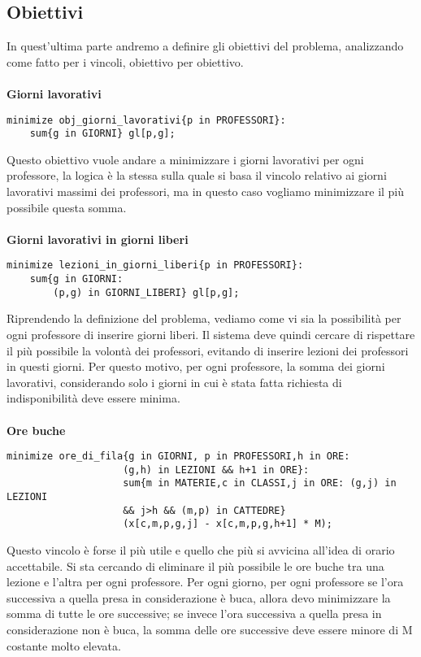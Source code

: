 \documentclass{article}
\begin{document}
\subsection{Obiettivi}
In quest'ultima parte andremo a definire gli obiettivi del problema, analizzando come fatto per i vincoli, obiettivo per obiettivo.
\\\\\textbf{Giorni lavorativi}
\begin{verbatim}
minimize obj_giorni_lavorativi{p in PROFESSORI}:
	sum{g in GIORNI} gl[p,g];
\end{verbatim}
Questo obiettivo vuole andare a minimizzare i giorni lavorativi per ogni professore, la logica è la stessa sulla quale si basa il vincolo relativo ai giorni lavorativi massimi dei professori, ma in questo caso vogliamo minimizzare il più possibile questa somma.
\\\\\textbf{Giorni lavorativi in giorni liberi}
\begin{verbatim}
minimize lezioni_in_giorni_liberi{p in PROFESSORI}:
	sum{g in GIORNI:
		(p,g) in GIORNI_LIBERI} gl[p,g];
\end{verbatim}
Riprendendo la definizione del problema, vediamo come vi sia la possibilità per ogni professore di inserire giorni liberi. Il sistema deve quindi cercare di rispettare il più possibile la volontà dei professori, evitando di inserire lezioni dei professori in questi giorni. Per questo motivo, per ogni professore, la somma dei giorni lavorativi, considerando solo i giorni in cui è stata fatta richiesta di indisponibilità deve essere minima.
\\\\\textbf{Ore buche}
\begin{verbatim}
minimize ore_di_fila{g in GIORNI, p in PROFESSORI,h in ORE: 
                    (g,h) in LEZIONI && h+1 in ORE}:
                    sum{m in MATERIE,c in CLASSI,j in ORE: (g,j) in LEZIONI
                    && j>h && (m,p) in CATTEDRE}
                    (x[c,m,p,g,j] - x[c,m,p,g,h+1] * M);
\end{verbatim}
Questo vincolo è forse il più utile e quello che più si avvicina all'idea di orario accettabile. Si sta cercando di eliminare il più possibile le ore buche tra una lezione e l'altra per ogni professore. Per ogni giorno, per ogni professore se l'ora successiva a quella presa in considerazione è buca, allora devo minimizzare la somma di tutte le ore successive; se invece l'ora successiva a quella presa in considerazione non è buca, la somma delle ore successive deve essere minore di M costante molto elevata.
\end{document}
